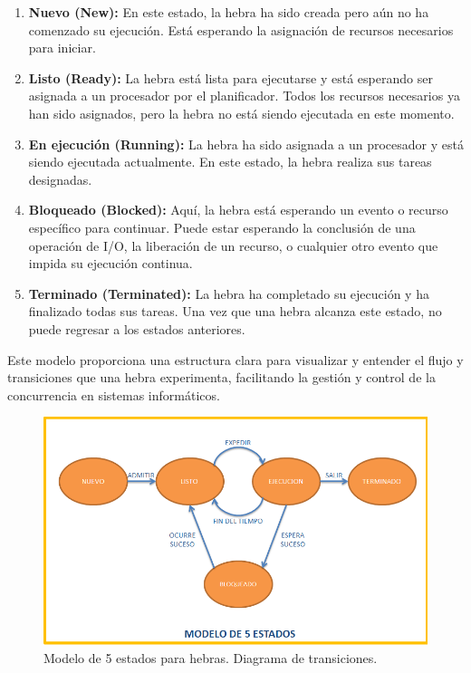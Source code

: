 \begin{enumerate}
    \item \textbf{Nuevo (New):} En este estado, la hebra ha sido creada pero aún no ha comenzado su ejecución. Está esperando la asignación de recursos necesarios para iniciar.

    \item \textbf{Listo (Ready):} La hebra está lista para ejecutarse y está esperando ser asignada a un procesador por el planificador. Todos los recursos necesarios ya han sido asignados, pero la hebra no está siendo ejecutada en este momento.

    \item \textbf{En ejecución (Running):} La hebra ha sido asignada a un procesador y está siendo ejecutada actualmente. En este estado, la hebra realiza sus tareas designadas.

    \item \textbf{Bloqueado (Blocked):} Aquí, la hebra está esperando un evento o recurso específico para continuar. Puede estar esperando la conclusión de una operación de I/O, la liberación de un recurso, o cualquier otro evento que impida su ejecución continua.

    \item \textbf{Terminado (Terminated):} La hebra ha completado su ejecución y ha finalizado todas sus tareas. Una vez que una hebra alcanza este estado, no puede regresar a los estados anteriores.
\end{enumerate}

Este modelo proporciona una estructura clara para visualizar y entender el flujo y transiciones que una hebra experimenta, facilitando la gestión y control de la concurrencia en sistemas informáticos.

\begin{figure}[h]
    \includegraphics[width=\linewidth]{images/implementacion/hebras/modelo5_estados.png}
    \caption{Modelo de 5 estados para hebras. Diagrama de transiciones.}
    \label{fig:modelo_estados_hebras}
\end{figure}

